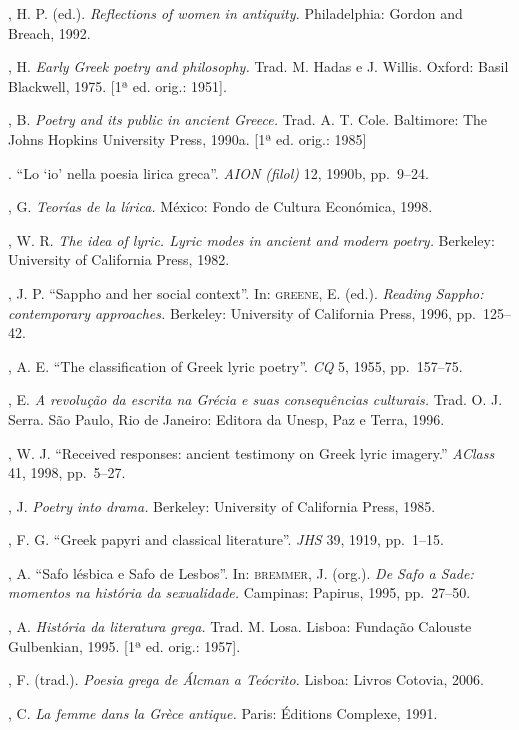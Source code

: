 \begin{bibliohedra}
, H. P. (ed.). \textit{Reflections of women in antiquity.}
Philadelphia: Gordon and Breach, 1992.

, H. \textit{Early Greek poetry and philosophy.} Trad. M. Hadas
e J. Willis. Oxford: Basil Blackwell, 1975. [1ª ed. orig.: 1951]. 

, B. \textit{Poetry and its public in ancient Greece.} Trad. A.
T. Cole. Baltimore: The Johns Hopkins University Press, 1990a.
[1ª ed. orig.: 1985]

\titidem. “Lo ‘io’ nella poesia lirica greca”. \textit{AION (filol)} 12,
1990b, pp.~9--24.

, G. \textit{Teorías de la lírica.} México: Fondo de
Cultura Económica, 1998.

, W. R. \textit{The idea of lyric. Lyric modes in ancient and
modern poetry.} Berkeley: University of California Press, 1982.

, J. P. “Sappho and her social context”. In: \textsc{greene}, E.
(ed.). \textit{Reading Sappho: contemporary approaches.} Berkeley: University
of California Press, 1996, pp.~125--42.

, A. E. “The classification of Greek lyric poetry”. \textit{CQ}
5, 1955, pp.~157--75.

, E. \textit{A revolução da escrita na Grécia e suas
consequências culturais.} Trad. O. J. Serra. São Paulo, Rio de Janeiro: Editora
da Unesp, Paz e Terra, 1996.

, W. J. ``Received responses: ancient testimony on Greek lyric imagery.'' 
\textit{AClass} 41, 1998, pp.~5--27. 

, J. \textit{Poetry into drama.} Berkeley: University of
California Press, 1985.

, F. G. “Greek papyri and classical literature”.
\textit{JHS} 39, 1919, pp.~1--15.

, A. “Safo lésbica e Safo de Lesbos”. In: \textsc{bremmer}, J.
(org.). \textit{De Safo a Sade: momentos na história da sexualidade.} Campinas:
Papirus, 1995, pp.~27--50.

, A. \textit{História da literatura grega.} Trad. M. Losa. Lisboa:
Fundação Calouste Gulbenkian, 1995. [1ª ed. orig.: 1957].

, F. (trad.). \textit{Poesia grega de Álcman a Teócrito.}
Lisboa: Livros Cotovia, 2006.

, C. \textit{La femme dans la Grèce antique.} Paris: Éditions
Complexe, 1991.


\end{bibliohedra}

